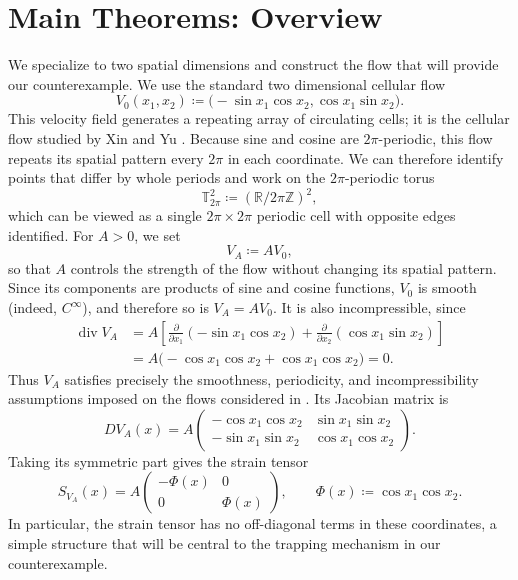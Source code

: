 \documentclass[11pt,reqno,noamsfonts]{amsart}
\theoremstyle{definition}
\theoremstyle{remark}
\begin{document}
\section{Main Theorems: Overview}\label{main-overv}
We specialize to two spatial dimensions and construct the flow that
will provide our counterexample.  We use the standard two dimensional cellular flow
\begin{equation}\label{cellular_flow}
    V_0(x_1,x_2)
  \coloneqq 
  \bigl(
    -\sin x_1\cos x_2, 
    \cos x_1\sin x_2
  \bigr).
\end{equation}
This velocity field generates a repeating array of circulating cells; it is the cellular flow studied by Xin and Yu
\cite{XinYu2014}. Because sine and cosine are $2\pi$-periodic, this flow repeats its
spatial pattern every $2\pi$ in each coordinate. We can therefore
identify points that differ by whole periods and work on the
$2\pi$-periodic torus
\[
  \mathbb T^2_{2\pi}
  \coloneqq 
  (\mathbb R/2\pi\mathbb Z)^2,
\]
which can be viewed as a single $2\pi\times2\pi$ periodic cell with
opposite edges identified.
For $A>0$, we set
\[
  V_A\coloneqq A V_0,
\]
so that $A$ controls the strength of the flow without changing its
spatial pattern.
Since its components are products of sine and cosine functions,
$V_0$ is smooth (indeed, $C^\infty$), and therefore so is
$V_A=A V_0$. It is also
incompressible, since
\[
\begin{aligned}
  \operatorname{div}V_A
  &=
  A\left[
    \frac{\partial}{\partial x_1}
      (-\sin x_1\cos x_2)
    +
    \frac{\partial}{\partial x_2}
      (\cos x_1\sin x_2)
  \right]\\
  &=A\bigl(
    -\cos x_1\cos x_2
    +\cos x_1\cos x_2
  \bigr)
  =0.
\end{aligned}
\]
Thus $V_A$ satisfies precisely the smoothness, periodicity, and incompressibility
assumptions imposed on the flows considered in \cite[Question~11]{XinYuRonney2024}.
Its Jacobian matrix is
\[
  DV_A(x)
  =
  A
  \begin{pmatrix}
    -\cos x_1\cos x_2 & \sin x_1\sin x_2\\
    -\sin x_1\sin x_2 & \cos x_1\cos x_2
  \end{pmatrix}.
\]
Taking its symmetric part gives the strain tensor
\begin{equation}\label{eq:strain-tensor-intro}
  S_{V_A}(x)
  =
  A
  \begin{pmatrix}
    -\Phi(x)&0\\
    0&\Phi(x)
  \end{pmatrix},
  \qquad
  \Phi(x)\coloneqq \cos x_1\cos x_2.
\end{equation}
In particular, the strain tensor has no off-diagonal terms in these
coordinates, a simple structure that will be central to the trapping
mechanism in our counterexample.
\end{document}
